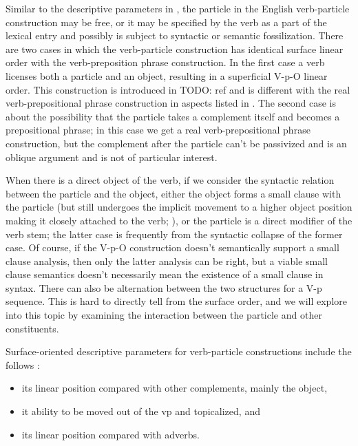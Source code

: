 \documentclass[UTF8, a4paper, oneside, scheme=plain, 12pt]{ctexbook}
\newcommand*{\citesec}[1]{\S~{#1}}
\newcommand*{\citechap}[1]{Ch.~{#1}}
\begin{document}
Similar to the descriptive parameters in ,
the particle in the English verb-particle construction may be free, 
or it may be specified by the verb as a part of the lexical entry
and possibly is subject to syntactic or semantic fossilization. 
There are two cases in which the verb-particle construction 
has identical surface linear order 
with the verb-preposition phrase construction.
In the first case a verb licenses both a particle and an object,
resulting in a superficial V-p-O linear order. 
This construction is introduced in TODO: ref
and is different with the real verb-prepositional phrase construction
in aspects listed in \citet[\citechap{4}, \citesec{6.2}]{cgel}.
The second case is about the possibility that the particle takes a complement itself 
and becomes a prepositional phrase;
in this case we get a real verb-prepositional phrase construction,
but the complement after the particle can't be passivized
and is an oblique argument and is not of particular interest.

When there is a direct object of the verb, 
if we consider the syntactic relation between the particle and the object, 
either the object forms a small clause with the particle
(but still undergoes the implicit movement to a higher object position 
making it closely attached to the verb; ), 
or the particle is a direct modifier of the verb stem; 
the latter case is frequently from the syntactic collapse of the former case.
Of course, if the V-p-O construction doesn't semantically support a small clause analysis, 
then only the latter analysis can be right, 
but a viable small clause semantics doesn't necessarily mean the existence of a small clause in syntax.
There can also be alternation between the two structures for a V-p sequence.
This is hard to directly tell from the surface order, 
and we will explore into this topic by examining the interaction between the particle and other constituents. 


Surface-oriented descriptive parameters for verb-particle constructions 
include the follows \citep[\citechap{4}, \citesec{6.3}]{cgel}:
\begin{itemize}
    \item its linear position compared with other complements, mainly the object, 
    \item it ability to be moved out of the \acs{vp}
        and topicalized, and 
    \item its linear position compared with adverbs.
\end{itemize}
\end{document}
